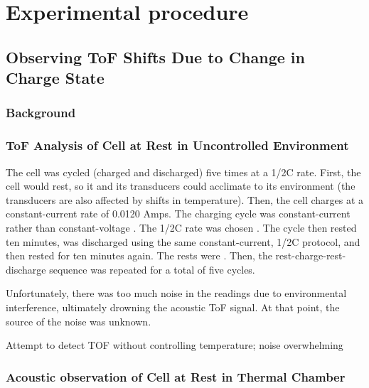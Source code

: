 \chapter{Experimental procedure}

\section{Observing ToF Shifts Due to Change in Charge State}

\subsection{Background}

\subsection{ToF Analysis of Cell at Rest in Uncontrolled Environment}

The cell was cycled (charged and discharged) five times at a 1/2C rate. First, the cell would rest, so it and its transducers could acclimate to its environment (the transducers are also affected by shifts in temperature). Then, the cell charges at a constant-current rate of 0.0120 Amps. The charging cycle was constant-current rather than constant-voltage . The 1/2C rate was chosen . The cycle then rested ten minutes, was discharged using the same constant-current, 1/2C protocol, and then rested for ten minutes again. The rests were . Then, the rest-charge-rest-discharge sequence was repeated for a total of five cycles.


Unfortunately, there was too much noise in the readings due to environmental interference, ultimately drowning the acoustic ToF signal. At that point, the source of the noise was unknown.

Attempt to detect TOF without controlling temperature; noise overwhelming
    
    
\subsection{Acoustic observation of Cell at Rest in Thermal Chamber}

